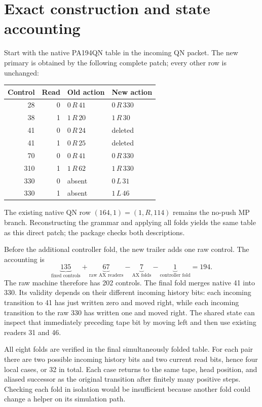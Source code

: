 \documentclass[11pt,letterpaper]{article}
\begin{document}
\section{Exact construction and state accounting}

Start with the native PA194QN table in the incoming QN packet. The new
primary is obtained by the following complete patch; every other row is
unchanged:
\begin{center}
\begin{tabular}{rrll}
\toprule Control & Read & Old action & New action\\\midrule
28&0&$0\,R\,41$&$0\,R\,330$\\
38&1&$1\,R\,20$&$1\,R\,30$\\
41&0&$0\,R\,24$&deleted\\
41&1&$0\,R\,25$&deleted\\
70&0&$0\,R\,41$&$0\,R\,330$\\
310&1&$1\,R\,62$&$1\,R\,330$\\
330&0&absent&$0\,L\,31$\\
330&1&absent&$1\,L\,46$\\
\bottomrule
\end{tabular}
\end{center}
The existing native QN row $(164,1)=(1,R,114)$ remains the no-push
MP branch. Reconstructing the grammar and applying all folds yields the
same table as this direct patch; the package checks both descriptions.

Before the additional controller fold, the new trailer adds one raw
control. The accounting is
\[
 \underbrace{135}_{\text{fixed controls}}
 +\underbrace{67}_{\text{raw AX readers}}
 -\underbrace{7}_{\text{AX folds}}
 -\underbrace{1}_{\text{controller fold}}
 =194.
\]
The raw machine therefore has 202 controls. The final fold merges native
41 into 330. Its validity depends on their different incoming history
bits: each incoming transition to 41 has just written zero and moved
right, while each incoming transition to the raw 330 has written one and
moved right. The shared state can inspect that immediately preceding
tape bit by moving left and then use existing readers 31 and 46.

All eight folds are verified in the final simultaneously folded table.
For each pair there are two possible incoming history bits and two
current read bits, hence four local cases, or 32 in total. Each case
returns to the same tape, head position, and aliased successor as the
original transition after finitely many positive steps. Checking each
fold in isolation would be insufficient because another fold could
change a helper on its simulation path.
\end{document}
